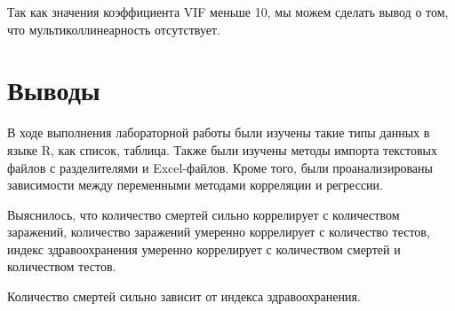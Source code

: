 \documentclass[a4paper,14pt]{extarticle}
\begin{document}
Так как значения коэффициента VIF меньше 10, мы можем сделать вывод о том, что
мультиколлинеарность отсутствует.

\section*{Выводы}
В ходе выполнения лабораторной работы были изучены такие типы данных в языке R,
как список, таблица. Также были изучены методы импорта текстовых файлов с
разделителями и Excel-файлов. Кроме того, были проанализированы зависимости между
переменными методами корреляции и регрессии.

Выяснилось, что количество смертей сильно коррелирует с количеством заражений,
количество заражений умеренно коррелирует с количество тестов, индекс здравоохранения
умеренно коррелирует с количеством смертей и количеством тестов.

Количество смертей сильно зависит от индекса здравоохранения.
\end{document}
